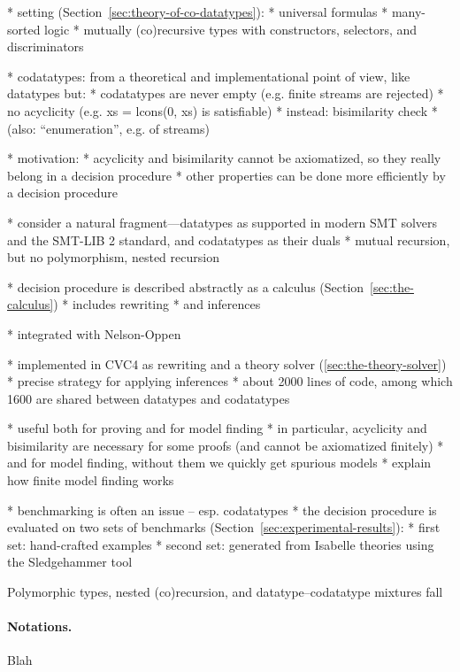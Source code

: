 \documentclass[a4paper,oribibl,envcountsame,draft]{llncs}
\begin{document}
  * setting (Section~\ref{sec:theory-of-co-datatypes}):
    * universal formulas
    * many-sorted logic
    * mutually (co)recursive types with constructors, selectors, and
      discriminators

  * codatatypes: from a theoretical and implementational point of view, like
      datatypes but:
    * codatatypes are never empty (e.g. finite streams are rejected)
    * no acyclicity (e.g. xs = lcons(0, xs) is satisfiable)
    * instead: bisimilarity check
    * (also: ``enumeration'', e.g. of streams)

  * motivation:
    * acyclicity and bisimilarity cannot be axiomatized, so they really belong in
      a decision procedure
    * other properties can be done more efficiently by a decision procedure

  * consider a natural fragment---datatypes as supported in modern SMT solvers
    and the SMT-LIB 2 standard, and codatatypes as their duals
    * mutual recursion, but no polymorphism, nested recursion

  * decision procedure is described abstractly as a calculus
    (Section~\ref{sec:the-calculus})
    * includes rewriting
    * and inferences

  * integrated with Nelson-Oppen

  * implemented in CVC4 as rewriting and a theory solver
    (\ref{sec:the-theory-solver})
    * precise strategy for applying inferences
    * about 2000 lines of code, among which 1600 are shared between datatypes
      and codatatypes

  * useful both for proving and for model finding
    * in particular, acyclicity and bisimilarity are necessary for some proofs
      (and cannot be axiomatized finitely)
    * and for model finding, without them we quickly get spurious models
    * explain how finite model finding works


  * benchmarking is often an issue -- esp. codatatypes
  * the decision procedure is evaluated on two sets of benchmarks
    (Section~\ref{sec:experimental-results}):
    * first set: hand-crafted examples
    * second set: generated from Isabelle theories using the Sledgehammer tool

Polymorphic types, nested (co)recursion, and datatype--codatatype mixtures fall

\paragraph{Notations.}
Blah
\end{document}
